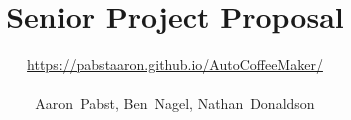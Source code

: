 \documentclass[conference]{IEEEtran}
\begin{document}
\title{Senior Project Proposal}

\author{\url{https://pabstaaron.github.io/AutoCoffeeMaker/} \\ \\ Aaron~Pabst, Ben~Nagel, Nathan~Donaldson}




% 
\end{document}
